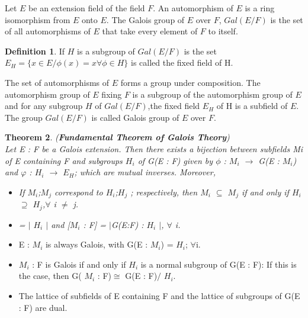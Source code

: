 \documentclass[12pt]{article}
\newtheorem{thm}{Theorem}[section]
\theoremstyle{definition}
\newtheorem{defn}[thm]{Definition}
\theoremstyle{remark}
\begin{document}
Let $E$ be an extension field of the field $F$. An automorphism of $E$ is a ring isomorphism from $E$ onto $E$. The Galois group of $E$ over $F$, $Gal(E/F)$ is the set of all automorphisms of $E$ that take every element of $F$ to itself.

\begin{defn}
If $H$ is a subgroup of $Gal(E/F)$ is the set $E_{H}=\{x\in E/\phi(x)=x\forall \phi \in H\}$ is called the fixed field of H.
\end{defn}

The set of automorphisms of $E$ forms a group under composition. The automorphism group of $E$ fixing $F$ is a subgroup of the automorphism group of $E$ and for any subgroup $H$ of $Gal(E/F)$,the fixed field $E_{H}$ of H is a subfield of $E$. The group $Gal(E/F)$ is called Galois group of $E$ over $F$.

\begin{thm}(\textbf{Fundamental Theorem of Galois Theory})
\\ Let E : F be a Galois extension. Then there exists a
bijection between subfields Mi of E containing F and subgroups $H_{i}$ of G(E : F) given by $\phi$ : $M_{i}$ $\rightarrow$ G(E : $M_{i}$)
and $\varphi$ : $H_{i}$ $\rightarrow$ $E_{H}$; which are mutual inverses. Moreover,
\begin{itemize}
 \item[1] If $M_{i}$;$M_{j}$ correspond to $H_{i}$;$H_{j}$ ; respectively, then $M_{i}$ $\subseteq$ $M_{j}$ if and only if $H_{i}$ $\supseteq$ $H_{j}$,$\forall$  i $\neq$ j.\\
  \item[2]  [E : $M_{i}$] = $|$ $H_{i}$ $|$ and [$M_{i}$ : F] = $|$G(E:F) : $H_{i}$ $|$, $\forall$ i.
\end{itemize}
\end{thm}

\begin{itemize}
   \item[3] E : $M_{i}$ is always Galois, with G(E : $M_{i}$) = $H_{i}$; $\forall$i.
   \item[4] $M_{i}$ : F is Galois if and only if  $H_{i}$ is a normal subgroup of G(E : F): If this is the case, then
G( $M_{i}$ : F)$\cong$ G(E : F)$/$ $H_{i}$.
\item[5] The lattice of subfields of E containing F and the lattice of subgroups of G(E : F) are dual.
\end{itemize}
\end{document}
